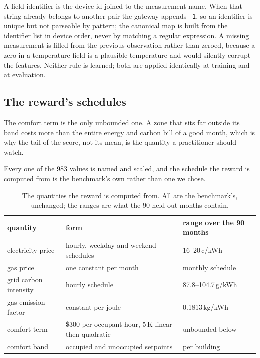 \documentclass{article}
\begin{document}
A field identifier is the device id joined to the measurement name. When that string already belongs to another pair the gateway appends \texttt{\_1}, so an identifier is unique but not parseable by pattern; the canonical map is built from the identifier list in device order, never by matching a regular expression. A missing measurement is filled from the previous observation rather than zeroed, because a zero in a temperature field is a plausible temperature and would silently corrupt the features. Neither rule is learned; both are applied identically at training and at evaluation.

\subsection{The reward's schedules}
\label{app:reward}

The comfort term is the only unbounded one. A zone that sits far outside its band costs more than the entire energy and carbon bill of a good month, which is why the tail of the score, not its mean, is the quantity a practitioner should watch.

Every one of the 983 values is named and scaled, and the schedule the reward is computed from is the benchmark's own rather than one we chose.

\begin{table}[h!]
\centering
\small
\begin{tabular}{@{}lll@{}}
\toprule
quantity & form & range over the 90 months \\
\midrule
electricity price & hourly, weekday and weekend schedules & 16--20\,¢/kWh \\
gas price & one constant per month & monthly schedule \\
grid carbon intensity & hourly schedule & 87.8--104.7\,g/kWh \\
gas emission factor & constant per joule & 0.1813\,kg/kWh \\
comfort term & \$300 per occupant-hour, 5\,K linear then quadratic & unbounded below \\
comfort band & occupied and unoccupied setpoints & per building \\
\bottomrule
\end{tabular}
\vspace{4pt}
\caption{The quantities the reward is computed from. All are the benchmark's, unchanged; the ranges are what the 90 held-out months contain.}
\label{tab:app_reward}
\end{table}
\end{document}

